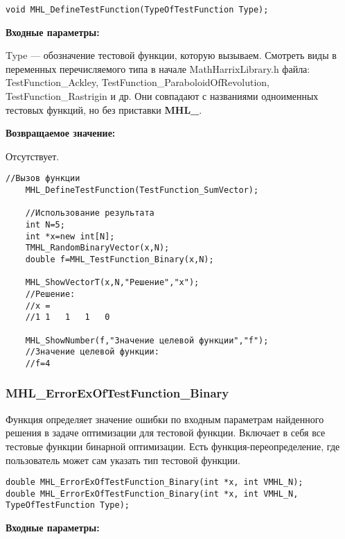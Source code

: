 \documentclass[a4paper,12pt]{article}
\begin{document}
\begin{lstlisting}[label=code_syntax_MHL_DefineTestFunction,caption=Синтаксис]
void MHL_DefineTestFunction(TypeOfTestFunction Type);
\end{lstlisting}

\textbf{Входные параметры:}
  
Type --- обозначение тестовой функции, которую вызываем.
Смотреть виды в переменных перечисляемого типа в начале MathHarrixLibrary.h файла: TestFunction\_Ackley, TestFunction\_ParaboloidOfRevolution, TestFunction\_Rastrigin и др. Они совпадают с названиями одноименных тестовых функций, но без приставки \textbf{MHL\_}.

\textbf{Возвращаемое значение:}
 
Отсутствует.


\begin{lstlisting}[label=code_use_MHL_DefineTestFunction,caption=Пример использования]
    //Вызов функции
    MHL_DefineTestFunction(TestFunction_SumVector);

    //Использование результата
    int N=5;
    int *x=new int[N];
    TMHL_RandomBinaryVector(x,N);
    double f=MHL_TestFunction_Binary(x,N);

    MHL_ShowVectorT(x,N,"Решение","x");
    //Решение:
    //x =	
    //1	1	1	1	0

    MHL_ShowNumber(f,"Значение целевой функции","f");
    //Значение целевой функции:
    //f=4
\end{lstlisting}

\subsubsection{MHL\_ErrorExOfTestFunction\_Binary}\label{MHL_ErrorExOfTestFunction_Binary}

Функция определяет значение ошибки по входным параметрам найденного решения в задаче оптимизации для тестовой функции. Включает в себя все тестовые функции бинарной оптимизации. Есть функция-переопределение, где пользователь может сам указать тип тестовой функции.


\begin{lstlisting}[label=code_syntax_MHL_ErrorExOfTestFunction_Binary,caption=Синтаксис]
double MHL_ErrorExOfTestFunction_Binary(int *x, int VMHL_N);
double MHL_ErrorExOfTestFunction_Binary(int *x, int VMHL_N, TypeOfTestFunction Type);
\end{lstlisting}

\textbf{Входные параметры:}
\end{document}
